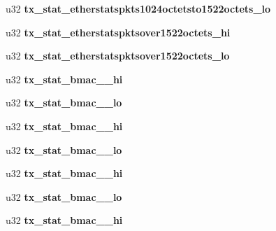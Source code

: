 \begin{DoxyCompactItemize}
\item 
\hypertarget{structbnx2x__eth__stats_a8a2800be71fd8b24eec258cf660d3469}{
u32 {\bfseries tx\_\-stat\_\-etherstatspkts1024octetsto1522octets\_\-lo}}
\label{structbnx2x__eth__stats_a8a2800be71fd8b24eec258cf660d3469}

\item 
\hypertarget{structbnx2x__eth__stats_a169380dea2038ff17372f5a99b0fa5dc}{
u32 {\bfseries tx\_\-stat\_\-etherstatspktsover1522octets\_\-hi}}
\label{structbnx2x__eth__stats_a169380dea2038ff17372f5a99b0fa5dc}

\item 
\hypertarget{structbnx2x__eth__stats_acdce2c072e36ca31879b143743d6bf65}{
u32 {\bfseries tx\_\-stat\_\-etherstatspktsover1522octets\_\-lo}}
\label{structbnx2x__eth__stats_acdce2c072e36ca31879b143743d6bf65}

\item 
\hypertarget{structbnx2x__eth__stats_a37b33267034ef84584c02bce964f1ced}{
u32 {\bfseries tx\_\-stat\_\-bmac\_\_\-hi}}
\label{structbnx2x__eth__stats_a37b33267034ef84584c02bce964f1ced}

\item 
\hypertarget{structbnx2x__eth__stats_a66af2d3889eeec261a38b7436641118a}{
u32 {\bfseries tx\_\-stat\_\-bmac\_\_\-lo}}
\label{structbnx2x__eth__stats_a66af2d3889eeec261a38b7436641118a}

\item 
\hypertarget{structbnx2x__eth__stats_adf2150f5a418354cc9ca0aea85a86feb}{
u32 {\bfseries tx\_\-stat\_\-bmac\_\_\-hi}}
\label{structbnx2x__eth__stats_adf2150f5a418354cc9ca0aea85a86feb}

\item 
\hypertarget{structbnx2x__eth__stats_aaaa7eb04c56398d6a7cbfb2d278a3262}{
u32 {\bfseries tx\_\-stat\_\-bmac\_\_\-lo}}
\label{structbnx2x__eth__stats_aaaa7eb04c56398d6a7cbfb2d278a3262}

\item 
\hypertarget{structbnx2x__eth__stats_a02892f6704f1b524a553e16b26d8c953}{
u32 {\bfseries tx\_\-stat\_\-bmac\_\_\-hi}}
\label{structbnx2x__eth__stats_a02892f6704f1b524a553e16b26d8c953}

\item 
\hypertarget{structbnx2x__eth__stats_ac2b63ac1761d7660eba852b030a01fb6}{
u32 {\bfseries tx\_\-stat\_\-bmac\_\_\-lo}}
\label{structbnx2x__eth__stats_ac2b63ac1761d7660eba852b030a01fb6}

\item 
\hypertarget{structbnx2x__eth__stats_aeef5277eeaaedec872b2783844820689}{
u32 {\bfseries tx\_\-stat\_\-bmac\_\_\-hi}}
\label{structbnx2x__eth__stats_aeef5277eeaaedec872b2783844820689}


\end{DoxyCompactItemize}
